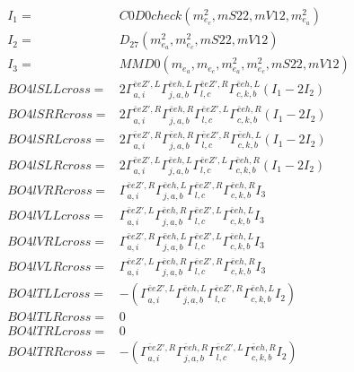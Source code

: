 \documentclass[A4,landscape]{article}
\begin{document}
\begin{align} 
I_1 = & C0D0check(m^2_{e_{{c}}}, mS22, mV12, m^2_{e_{{a}}}) \\ 
I_2 = & D_{27}(m^2_{e_{{a}}}, m^2_{e_{{c}}}, mS22, mV12) \\ 
I_3 = & MMD0(m_{e_{{a}}}, m_{e_{{c}}}, m^2_{e_{{a}}}, m^2_{e_{{c}}}, mS22, mV12) \\ 
  BO4lSLLcross= & 2  \Gamma^{\bar{e}e {Z'} ,L}_{a, i} \Gamma^{\bar{e}e h ,L}_{j, a, b} \Gamma^{\bar{e}e {Z'} ,R}_{l, c} \Gamma^{\bar{e}e h ,L}_{c, k, b} (I_1 - 2 I_2) \\ 
  BO4lSRRcross= & 2  \Gamma^{\bar{e}e {Z'} ,R}_{a, i} \Gamma^{\bar{e}e h ,R}_{j, a, b} \Gamma^{\bar{e}e {Z'} ,L}_{l, c} \Gamma^{\bar{e}e h ,R}_{c, k, b} (I_1 - 2 I_2) \\ 
  BO4lSRLcross= & 2  \Gamma^{\bar{e}e {Z'} ,R}_{a, i} \Gamma^{\bar{e}e h ,R}_{j, a, b} \Gamma^{\bar{e}e {Z'} ,R}_{l, c} \Gamma^{\bar{e}e h ,L}_{c, k, b} (I_1 - 2 I_2) \\ 
  BO4lSLRcross= & 2  \Gamma^{\bar{e}e {Z'} ,L}_{a, i} \Gamma^{\bar{e}e h ,L}_{j, a, b} \Gamma^{\bar{e}e {Z'} ,L}_{l, c} \Gamma^{\bar{e}e h ,R}_{c, k, b} (I_1 - 2 I_2) \\ 
  BO4lVRRcross= &  \Gamma^{\bar{e}e {Z'} ,R}_{a, i} \Gamma^{\bar{e}e h ,L}_{j, a, b} \Gamma^{\bar{e}e {Z'} ,R}_{l, c} \Gamma^{\bar{e}e h ,R}_{c, k, b} I_3 \\ 
  BO4lVLLcross= &  \Gamma^{\bar{e}e {Z'} ,L}_{a, i} \Gamma^{\bar{e}e h ,R}_{j, a, b} \Gamma^{\bar{e}e {Z'} ,L}_{l, c} \Gamma^{\bar{e}e h ,L}_{c, k, b} I_3 \\ 
  BO4lVRLcross= &  \Gamma^{\bar{e}e {Z'} ,R}_{a, i} \Gamma^{\bar{e}e h ,L}_{j, a, b} \Gamma^{\bar{e}e {Z'} ,L}_{l, c} \Gamma^{\bar{e}e h ,L}_{c, k, b} I_3 \\ 
  BO4lVLRcross= &  \Gamma^{\bar{e}e {Z'} ,L}_{a, i} \Gamma^{\bar{e}e h ,R}_{j, a, b} \Gamma^{\bar{e}e {Z'} ,R}_{l, c} \Gamma^{\bar{e}e h ,R}_{c, k, b} I_3 \\ 
  BO4lTLLcross= & -( \Gamma^{\bar{e}e {Z'} ,L}_{a, i} \Gamma^{\bar{e}e h ,L}_{j, a, b} \Gamma^{\bar{e}e {Z'} ,R}_{l, c} \Gamma^{\bar{e}e h ,L}_{c, k, b} I_2) \\ 
  BO4lTLRcross= & 0 \\ 
  BO4lTRLcross= & 0 \\ 
  BO4lTRRcross= & -( \Gamma^{\bar{e}e {Z'} ,R}_{a, i} \Gamma^{\bar{e}e h ,R}_{j, a, b} \Gamma^{\bar{e}e {Z'} ,L}_{l, c} \Gamma^{\bar{e}e h ,R}_{c, k, b} I_2) \\ 
\end{align} 
\end{document}
